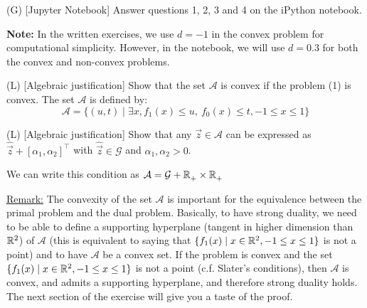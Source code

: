 \begin{enumerate}
    \qitem (G) [Jupyter Notebook] Answer questions 1, 2, 3 and 4 on the iPython notebook.
    
    \textbf{Note:} In the written exercises, we use $d=-1$ in the convex problem for computational simplicity. However, in the notebook, we will use $d=0.3$ for both the convex and non-convex problems.
    
     \sol{}
    
    \qitem (L) [Algebraic justification] Show that the set $\mathcal{A}$ is convex if the problem (1) is convex. The set $\mathcal{A}$ is defined by:
    \[\mathcal{A} = \{(u, t)\mid\exists x, f_1(x)\leq u, \ f_0(x)\leq t, -1 \leq x \leq 1\}\]
    
    
    \sol{}
    
    \qitem (L) [Algebraic justification]
    Show that any $\vec{z}\in \mathcal{A}$ can be expressed as $\hat{\vec{z}}+[\alpha_1, \alpha_2]^\top$ with $\hat{\vec{z}}\in \mathcal{G}$ and $\alpha_1,\alpha_2>0$.
    
    We can write this condition as $\mathcal{A} = \mathcal{G} + \mathbb{R}^{}_+\times\mathbb{R}^{}_+$
    
    
    \sol{}
    
    \underline{Remark:} The convexity of the set $\mathcal{A}$ is important for the equivalence between the primal problem and the dual problem. Basically, to have strong duality, we need to be able to define a supporting hyperplane (tangent in higher dimension than $\mathbb{R}^{2}$) of $\mathcal{A}$ (this is equivalent to saying that $\{f_1(x) \mid x\in \mathbb{R}^{2}, -1\leq x\leq 1\}$ is not a point) and to have $\mathcal{A}$ be a convex set. 
    If the problem is convex and the set $\{f_1(x) \mid x\in \mathbb{R}^{2}, -1\leq x\leq 1\}$ is not a point (c.f. Slater's conditions), then $\mathcal{A}$ is convex, and admits a supporting hyperplane, and therefore strong duality holds. The next section of the exercise will give you a taste of the proof.
\end{enumerate}

